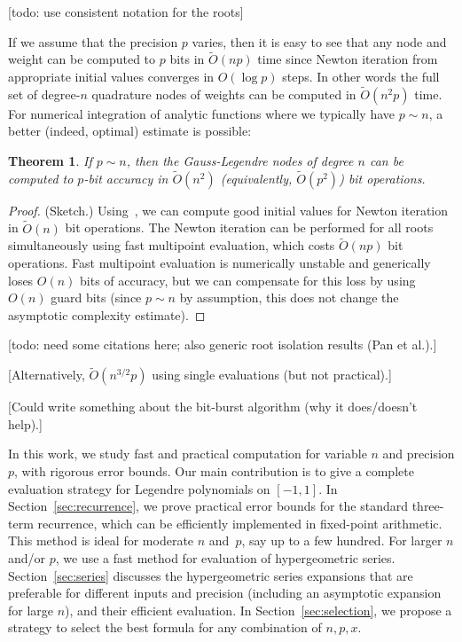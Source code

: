 \documentclass[11pt,a4paper]{article}
\newtheorem{theorem}{Theorem}
\begin{document}
[todo: use consistent notation for the roots]

If we assume that the precision $p$ varies,
then it is easy to see that any node and weight
can be computed to $p$ bits in $\widetilde{O}(n p)$ time
since Newton iteration from appropriate
initial values converges in $O(\log p)$ steps.
In other words the
full set of degree-$n$ quadrature nodes of weights
can be computed in $\widetilde{O}(n^2 p)$ time.
For numerical integration of analytic functions
where we typically have $p \sim n$, a better (indeed, optimal) estimate is possible:

\begin{theorem}
\label{thm:complexity}
If $p \sim n$, then the Gauss-Legendre nodes of degree $n$ can be computed to
$p$-bit accuracy in $\widetilde{O}(n^2)$ (equivalently, $\widetilde{O}(p^2)$) bit operations.
\end{theorem}

\begin{proof}
(Sketch.)
Using~\cite{petras1999computation},
we can compute good initial values for Newton iteration
in $\widetilde{O}(n)$ bit operations.
The Newton iteration can be performed for all roots
simultaneously using fast multipoint evaluation, which costs
$\widetilde{O}(n p)$ bit operations.
Fast multipoint evaluation is numerically unstable and
generically loses $O(n)$ bits of accuracy, but we can compensate for
this loss by using $O(n)$ guard bits
(since $p \sim n$ by assumption, this does not change the asymptotic complexity estimate).
\end{proof}

[todo: need some citations here; also generic root isolation results (Pan et al.).]

[Alternatively, $\widetilde{O}(n^{3/2} p)$ using single evaluations (but not practical).]

[Could write something about the bit-burst algorithm (why it does/doesn't help).]

In this work, we study fast and practical computation for variable $n$
and precision $p$, with rigorous error bounds.
Our main contribution is to give a complete evaluation strategy
for Legendre polynomials on $[-1,1]$.
In Section~\ref{sec:recurrence},
we prove practical error bounds for the standard three-term recurrence,
which can be efficiently implemented
in fixed-point arithmetic.
This method is ideal
for moderate $n$ and~$p$, say up to a few hundred.
For larger $n$ and/or $p$, we use a fast method for evaluation
of hypergeometric series.
Section~\ref{sec:series} discusses the hypergeometric series
expansions that are preferable for different inputs and precision
(including an asymptotic expansion for large $n$),
and their efficient evaluation.
In Section \ref{sec:selection}, we propose a strategy to select the
best formula for any combination of $n, p, x$.
\end{document}
